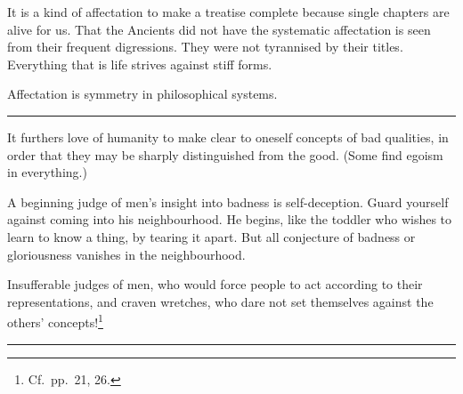 \documentclass[12pt]{article}
\newcommand{\opage}[1]{\marginnote{\footnotesize\textit{[#1]}}}
\newcommand{\ombreak}{\par\medskip\begin{center}\rule{0.32\textwidth}{0.4pt}\end{center}\medskip}
\begin{document}
It is a kind of affectation to make a treatise complete because single chapters are alive for us. \opage{188}That the Ancients did not have the systematic affectation is seen from their frequent digressions. They were not tyrannised by their titles. Everything that is life strives against stiff forms.

Affectation is symmetry in philosophical systems.

\ombreak

It furthers love of humanity to make clear to oneself concepts of bad qualities, in order that they may be sharply distinguished from the good. (Some find egoism in everything.)

A beginning judge of men's insight into badness is self-deception. Guard yourself against coming into his neighbourhood. He begins, like the toddler who wishes to learn to know a thing, by tearing it apart. But all conjecture of badness or gloriousness vanishes in the neighbourhood.

Insufferable judges of men, who would force people to act according to their representations, and craven wretches, who dare not set themselves against the others' concepts!\footnote{Cf.\ pp.\ 21, 26.}

\ombreak
\end{document}
